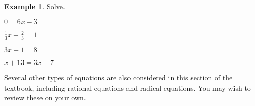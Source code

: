 \documentclass[letterpaper,12pt,oneside]{book}
\theoremstyle{definition}
\newtheorem{example}[theorem]{Example}
\begin{document}
\begin{example}
\item Solve.
\begin{enumerate}
\begin{multicols}{2}
\item $0=6x-3$
\vspace{3cm}
\item $\tfrac{1}{3}x+\tfrac{2}{3}=1$
\vspace{3cm}
\item $3x+1=8$
\vspace{3cm}
\item $x+13=3x+7$
\vspace{3cm}
\end{multicols}
\end{enumerate}
\vfill
\end{example}

\noindent
Several other types of equations are also considered in this section of the textbook, including rational equations and radical equations.  You may wish to review these on your own.
\end{document}
